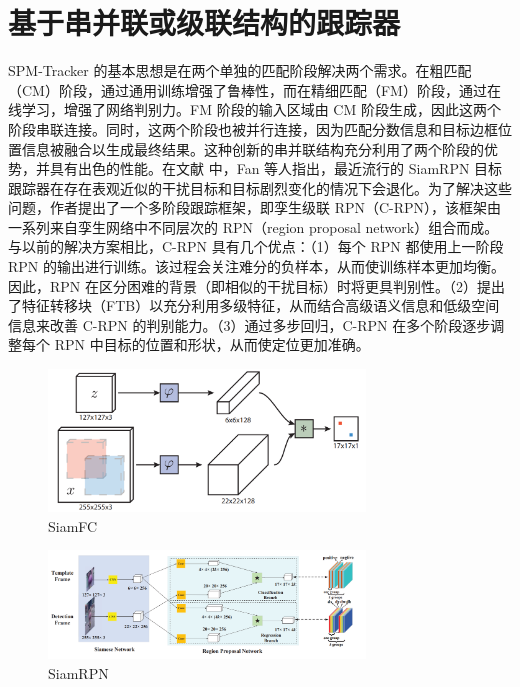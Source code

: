 \section{基于串并联或级联结构的跟踪器}
SPM-Tracker \cite{SPM} 的基本思想是在两个单独的匹配阶段解决两个需求。在粗匹配（CM）阶段，通过通用训练增强了鲁棒性，而在精细匹配（FM）阶段，通过在线学习，增强了网络判别力。FM 阶段的输入区域由 CM 阶段生成，因此这两个阶段串联连接。同时，这两个阶段也被并行连接，因为匹配分数信息和目标边框位置信息被融合以生成最终结果。这种创新的串并联结构充分利用了两个阶段的优势，并具有出色的性能。在文献 \cite{fan2019siamese} 中，Fan 等人指出，最近流行的 SiamRPN \cite{SiamRPN} 目标跟踪器在存在表观近似的干扰目标和目标剧烈变化的情况下会退化。为了解决这些问题，作者提出了一个多阶段跟踪框架，即孪生级联 RPN（C-RPN），该框架由一系列来自孪生网络中不同层次的 RPN（region proposal network）组合而成。与以前的解决方案相比，C-RPN 具有几个优点：（1）每个 RPN 都使用上一阶段 RPN 的输出进行训练。该过程会关注难分的负样本，从而使训练样本更加均衡。因此，RPN 在区分困难的背景（即相似的干扰目标）时将更具判别性。（2）提出了特征转移块（FTB）以充分利用多级特征，从而结合高级语义信息和低级空间信息来改善 C-RPN 的判别能力。（3）通过多步回归，C-RPN 在多个阶段逐步调整每个 RPN 中目标的位置和形状，从而使定位更加准确。
\iffalse
\begin{figure}
\centering
\includegraphics[width=0.75\textwidth]{Img/related/SiamFC.png}
\caption{SiamFC}
\end{figure}

\begin{figure}
\centering
\includegraphics[width=0.75\textwidth]{Img/related/SiamRPN.png}
\caption{SiamRPN}
\end{figure}

